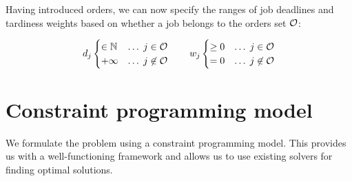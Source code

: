 Having introduced orders, we can now specify the ranges of job deadlines and tardiness weights
based on whether a job belongs to the orders set $\mathcal{O}$:

$$
d_{j} \begin{cases}
    \in \mathbb{N}    &\dots\;   j     \in \mathcal{O} \\
    +\infty   &\dots\;   j \not\in \mathcal{O}
\end{cases}
\qquad
w_{j} \begin{cases}
    \geq 0   &\dots\;   j     \in \mathcal{O} \\
       = 0   &\dots\;   j \not\in \mathcal{O}
\end{cases}
$$

\section{Constraint programming model} \label{sec:problem-statement/constraint-programming-model}

We formulate the problem using a constraint programming model.
This provides us with a well-functioning framework
and allows us to use existing solvers for finding optimal solutions.

